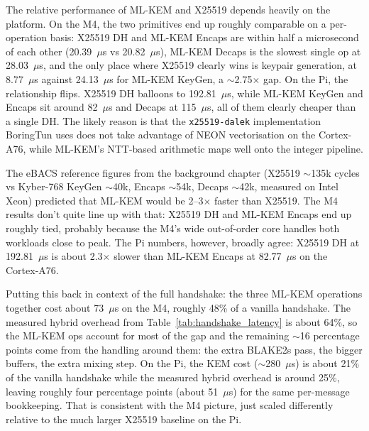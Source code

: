 The relative performance of ML-KEM and X25519 depends heavily on the platform. On the M4, the two primitives end up roughly comparable on a per-operation basis: X25519 DH and ML-KEM Encaps are within half a microsecond of each other (20.39~$\mu$s vs 20.82~$\mu$s), ML-KEM Decaps is the slowest single op at 28.03~$\mu$s, and the only place where X25519 clearly wins is keypair generation, at 8.77~$\mu$s against 24.13~$\mu$s for ML-KEM KeyGen, a $\sim$2.75$\times$ gap. On the Pi, the relationship flips. X25519 DH balloons to 192.81~$\mu$s, while ML-KEM KeyGen and Encaps sit around 82~$\mu$s and Decaps at 115~$\mu$s, all of them clearly cheaper than a single DH. The likely reason is that the \texttt{x25519-dalek} implementation BoringTun uses does not take advantage of NEON vectorisation on the Cortex-A76, while ML-KEM's NTT-based arithmetic maps well onto the integer pipeline.

The eBACS reference figures from the background chapter (X25519 $\sim$135k cycles vs Kyber-768 KeyGen $\sim$40k, Encaps $\sim$54k, Decaps $\sim$42k, measured on Intel Xeon) predicted that ML-KEM would be 2--3$\times$ faster than X25519. The M4 results don't quite line up with that: X25519 DH and ML-KEM Encaps end up roughly tied, probably because the M4's wide out-of-order core handles both workloads close to peak. The Pi numbers, however, broadly agree: X25519 DH at 192.81~$\mu$s is about 2.3$\times$ slower than ML-KEM Encaps at 82.77~$\mu$s on the Cortex-A76.

Putting this back in context of the full handshake: the three ML-KEM operations together cost about 73~$\mu$s on the M4, roughly 48\% of a vanilla handshake. The measured hybrid overhead from Table~\ref{tab:handshake_latency} is about 64\%, so the ML-KEM ops account for most of the gap and the remaining $\sim$16 percentage points come from the handling around them: the extra BLAKE2s pass, the bigger buffers, the extra mixing step. On the Pi, the KEM cost ($\sim$280~$\mu$s) is about 21\% of the vanilla handshake while the measured hybrid overhead is around 25\%, leaving roughly four percentage points (about 51~$\mu$s) for the same per-message bookkeeping. That is consistent with the M4 picture, just scaled differently relative to the much larger X25519 baseline on the Pi.
